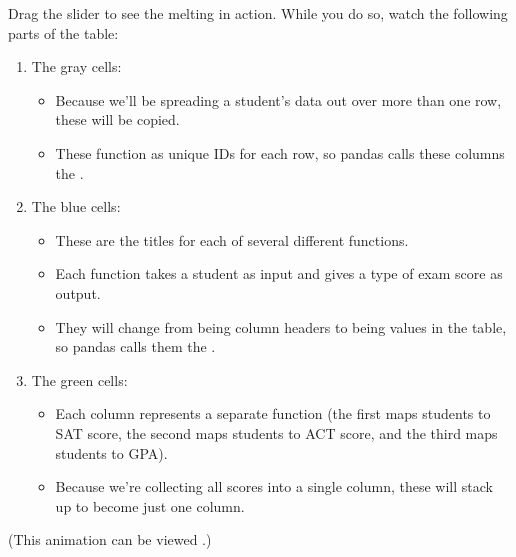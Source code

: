 \documentclass[letterpaper,10pt,english]{sphinxmanual}
\begin{document}
Drag the slider to see the melting in action.  While you do so, watch the following parts of the table:
\begin{enumerate}
%
\item {} 
The gray cells:
\begin{itemize}
\item {} 
Because we’ll be spreading a student’s data out over more than one row, these will be copied.

\item {} 
These function as unique IDs for each row, so pandas calls these columns the .

\end{itemize}

\item {} 
The blue cells:
\begin{itemize}
\item {} 
These are the titles for each of several different functions.

\item {} 
Each function takes a student as input and gives a type of exam score as output.

\item {} 
They will change from being column headers to being values in the table, so pandas calls them the .

\end{itemize}

\item {} 
The green cells:
\begin{itemize}
\item {} 
Each column represents a separate function (the first maps students to SAT score, the second maps students to ACT score, and the third maps students to GPA).

\item {} 
Because we’re collecting all scores into a single column, these will stack up to become just one column.

\end{itemize}

\end{enumerate}

(This animation can be viewed .)

\begin{sphinxVerbatim}[commandchars=\\\{\}]
   
 
          
\end{sphinxVerbatim}
\end{document}
